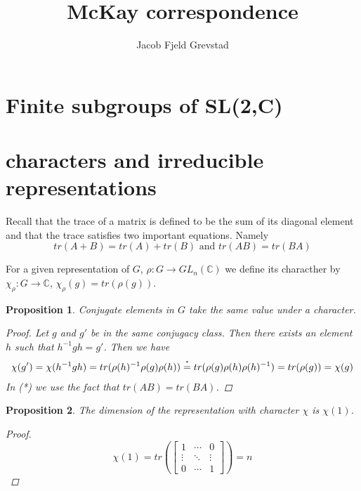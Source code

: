 \documentclass[11pt, a4paper, norsk]{article}
\newtheorem*{prop}{Proposition}
\begin{document}
\title{McKay correspondence}
\author{Jacob Fjeld Grevstad}
\maketitle

\section*{Finite subgroups of SL(2,C)}

\section*{characters and irreducible representations}
Recall that the trace of a matrix is defined to be the sum of its diagonal element and that the trace satisfies two important equations. Namely
$$tr(A+B)=tr(A)+tr(B) \text{  and  } tr(AB)=tr(BA)$$

For a given representation of $G$, $\rho: G \to GL_n(\mathbb{C})$ we define its characther by $\chi_\rho : G \to \mathbb{C}$, $\chi_\rho(g) = tr(\rho(g))$.

\begin{prop}
Conjugate elements in $G$ take the same value under a character.
\begin{proof}
Let $g$ and $g'$ be in the same conjugacy class. Then there exists an element $h$ such that $h^{-1}gh=g'$. Then we have
\begin{equation*}
\begin{split}
\chi(g')=\chi(h^{-1}gh) = tr(\rho(h)^{-1}\rho(g)\rho(h)) \stackrel{\mathclap{\normalfont\mbox{\tiny{*}}}}{=} tr(\rho(g)\rho(h)\rho(h)^{-1}) = tr(\rho(g))=\chi(g)
\end{split}
\end{equation*}
In (*) we use the fact that $tr(AB)=tr(BA)$.
\end{proof}
\end{prop}

\begin{prop}
The dimension of the representation with character $\chi$ is $\chi(1)$.
\begin{proof}
$$\chi(1) = tr\left(\begin{bmatrix}
1 & \cdots & 0\\
\vdots & \ddots & \vdots\\
0 & \cdots & 1
\end{bmatrix}\right) = n$$
\end{proof}
\end{prop}
\end{document}
